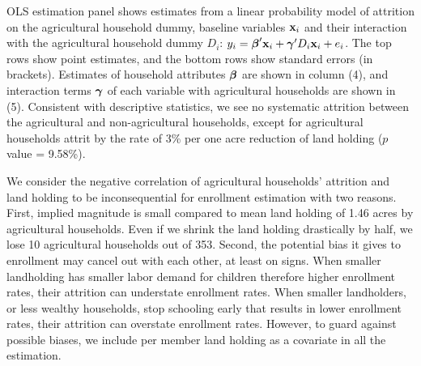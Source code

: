 \documentclass[12pt,letterpaper]{article}\usepackage[margin=1in]{geometry}
\newcommand{\bfbeta}{\ensuremath{\mbox{\boldmath $\beta$}}}
\newcommand{\bfgamma}{\ensuremath{\mbox{\boldmath $\gamma$}}}
\newcommand{\bfx}{\ensuremath{\mbox{\bf x}}}
\newcommand{\0}{\ensuremath{\mbox{\boldmath $0$}}}
\begin{document}
\textsf{OLS estimation} panel shows estimates from a linear probability model of attrition on the agricultural household dummy, baseline variables $\bfx_{i}$ and their interaction with the agricultural household dummy $D_{i}$: $y_{i}=\bfbeta'\bfx_{i}+\bfgamma'D_{i}\bfx_{i}+e_{i}$. The top rows show point estimates, and the bottom rows show standard errors (in brackets). Estimates of household attributes $\bfbeta$ are shown in column (4), and interaction terms $\bfgamma$ of each variable with agricultural households are shown in (5). Consistent with descriptive statistics, we see no systematic attrition between the agricultural and non-agricultural households, except for agricultural households attrit by the rate of 3\% per one acre reduction of land holding ($p$ value = 9.58\%). 

We consider the negative correlation of agricultural households' attrition and land holding to be inconsequential for enrollment estimation with two reasons. First, implied magnitude is small compared to mean land holding of 1.46 acres by agricultural households. Even if we shrink the land holding drastically by half, we lose 10 agricultural households out of 353. Second, the potential bias it gives to enrollment may cancel out with each other, at least on signs. When smaller landholding has smaller labor demand for children therefore higher enrollment rates, their attrition can understate enrollment rates. When smaller landholders, or less wealthy households, stop schooling early that results in lower enrollment rates, their attrition can overstate enrollment rates. However, to guard against possible biases, we include per member land holding as a covariate in all the estimation.  
\end{document}
